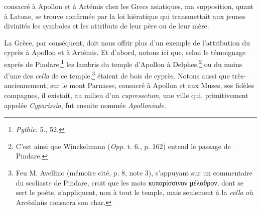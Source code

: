 \documentclass{article}
\begin{document}
consacré à Apollon et à Artémis chez les Grecs asiatiques, ma supposition, quant à Latone, se trouve confirmée par la loi hiératique qui transmettait aux jeunes divinités les symboles et les attributs de leur père ou de leur mère.

La Grèce, par conséquent, doit nous offrir plus d'un exemple de l'attribution du cyprès à Apollon et à Artémis. Et d'abord, notons ici que, selon le témoignage exprès de Pindare,\footnote{\emph{Pythic.} 5., 52.} les lambris du temple d'Apollon à Delphes,\footnote{C'est ainsi que Winckelmann (\emph{Opp.} t. 6., p. 162) entend le passage de Pindare.} ou du moins d'une des \emph{cella} de ce temple,\footnote{Feu M. Avellino (mémoire cité, p. 8, note 3), s'appuyant sur un commentaire du scoliaste de Pindare, croit que les mots \textgreek{κυπαρίσσινον μέλαθρον}, dont se sert le poète, s'appliquent, non à tout le temple, mais seulement à la \emph{cella} où Arcésilaüs consacra son char.} étaient de bois de cyprès. Notons aussi que très-anciennement, sur le mont Parnasse, consacré à Apollon et aux Muses, ses fidèles compagnes, il existait, au milieu d'un \emph{cupressetum}, une ville qui, primitivement appelée \emph{Cyparissia}, fut ensuite nommée \emph{Apolloniade}.
\end{document}
